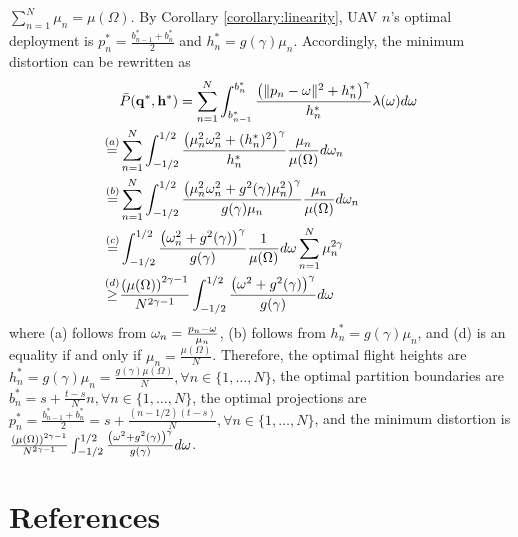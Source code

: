 \documentclass[12pt,onecolumn,journal,draftclsnofoot,letterpaper]{IEEEtran}
\newif\ifarxiv\arxivfalse
\renewcommand{\vp}{\mathbf q}
\newcommand{\df}{\ensuremath{\lam}}         %
\newcommand{\bP}{\ensuremath{\vp}}          %
\newcommand{\abPo}{\ensuremath{\bar{P}}}  %
\newcommand{\bH}{\ensuremath{\vh}}          %
\newcommand{\Vor}{\ensuremath{\mathcal{V}}}         %
\newcommand{\philippstart}{\color{black}}
\newcommand{\philippend}{\color{black}}
\newcommand{\junend}{\color{black}}
\begin{document}
$\sum_{n=1}^{N}\mu_n=\mu(\Omega)$.  By Corollary \ref{corollary:linearity}, UAV $n$'s optimal deployment is
$p^*_n=\frac{b^*_{n-1}+b^*_{n}}{2}$ and $h^*_n=g(\gamma)\mu_n$.  Accordingly, the minimum distortion can be rewritten as
%
\begin{align}
    &\abPo(\bP^*,\bH^*)=\sum_{n=1}^{N}\int_{b^*_{n-1}}^{b^*_{n}}\frac{\left(\|p_n-\ome\|^2+h^*_n\right)^{\gamma}}{h^*_n}\df(\ome) d\ome\\
    \overset{(a)}{=}&\sum_{n=1}^{N}\int_{-1/2}^{1/2} \frac{\left(\mu^2_n\ome^2_n+(h^*_n)^2\right)^{\gamma}}{h^*_n} \frac{\mu_n}{\mu(\Omega)}d\ome_n\\
    \overset{(b)}{=}&\sum_{n=1}^{N}\int_{-1/2}^{1/2}\frac{\left(\mu^2_n\ome^2_n+g^2(\gamma)\mu^2_n\right)^{\gamma}}{g(\gamma)\mu_n} \frac{\mu_n}{\mu(\Omega)}d\ome_n\\
    \overset{(c)}{=}&\int_{-1/2}^{1/2}\frac{\left(\ome^2_n+g^2(\gamma)\right)^{\gamma}}{g(\gamma)} \frac{1}{\mu(\Omega)}d\ome\sum_{n=1}^{N}\mu^{2\gamma}_n\\
    \overset{(d)}{\ge}&\frac{\left(\mu(\Omega)\right)^{2\gamma-1}}{N^{2\gamma-1}}\int_{-1/2}^{1/2}\frac{\left(\ome^2+g^2(\gamma)\right)^{\gamma}}{g(\gamma)} d\ome
\end{align}
%
where (a) follows from $\omega_n=\frac{p_n-\omega}{\mu_n}$, (b) follows from $h^*_n=g(\gamma)\mu_n$, and (d) is an equality
if and only if $\mu_n=\frac{\mu(\Omega)}{N}$.  Therefore, the optimal flight heights are
$h^*_n=g(\gamma)\mu_n=\frac{g(\gamma)\mu(\Omega)}{N}, \forall n\in\{1,\dots,N\}$, the optimal partition boundaries are
$b^*_n=s+\frac{t-s}{N}n, \forall n\in\{1,\dots,N\}$, the optimal projections are
$p^*_n=\frac{b^*_{n-1}+b^*_{n}}{2}=s+\frac{(n-1/2)(t-s)}{N}, \forall n\in\{1,\dots,N\}$, and the minimum distortion is
$\frac{\left(\mu(\Omega)\right)^{2\gamma-1}}{N^{2\gamma-1}}\int_{-1/2}^{1/2}\frac{\left(\omega^2+g^2(\gamma)\right)^{\gamma}}{g(\gamma)}
d\omega$.
\fi \junend \philippstart
%
\philippend
\section*{References} \ifarxiv \else \vspace{-4ex} \fi \printbibliography
\end{document}
